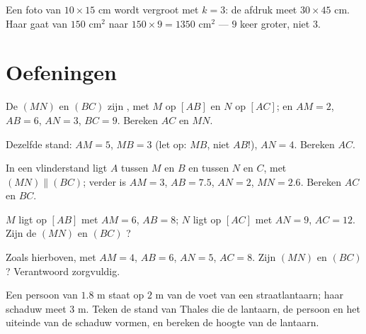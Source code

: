 \begin{example}
Een foto van $10 \times 15$ cm wordt vergroot met  $k = 3$: de afdruk
meet $30 \times 45$ cm. Haar  gaat van $150$ cm$^2$ naar
$150 \times 9 = 1350$ cm$^2$ --- $9$ keer groter, niet $3$.
\end{example}

\section{Oefeningen}

\begin{exercise}[$\star$]\label{exo:g9:thales:1}
De  $(MN)$ en $(BC)$ zijn , met $M$ op $[AB]$ en $N$ op $[AC]$; en
$AM = 2$, $AB = 6$, $AN = 3$, $BC = 9$. Bereken $AC$ en $MN$.
\end{exercise}

\begin{exercise}[$\star$]\label{exo:g9:thales:2}
Dezelfde stand: $AM = 5$, $MB = 3$ (let op: $MB$, niet $AB$!), $AN = 4$. Bereken
$AC$.
\end{exercise}

\begin{exercise}[$\star$]\label{exo:g9:thales:3}
In een vlinderstand ligt $A$ tussen $M$ en $B$ en tussen $N$ en $C$, met
$(MN) \parallel (BC)$; verder is $AM = 3$, $AB = 7.5$, $AN = 2$, $MN = 2.6$.
Bereken $AC$ en $BC$.
\end{exercise}

\begin{exercise}[$\star$]\label{exo:g9:thales:4}
$M$ ligt op $[AB]$ met $AM = 6$, $AB = 8$; $N$ ligt op $[AC]$ met $AN = 9$,
$AC = 12$. Zijn de  $(MN)$ en $(BC)$ ?
\end{exercise}

\begin{exercise}[$\star\star$]\label{exo:g9:thales:5}
Zoals hierboven, met $AM = 4$, $AB = 6$, $AN = 5$, $AC = 8$. Zijn $(MN)$ en
$(BC)$ ? Verantwoord zorgvuldig.
\end{exercise}

\begin{exercise}[$\star\star$]\label{exo:g9:thales:6}
Een persoon van $1.8$ m staat op $2$ m van de voet van een straatlantaarn; haar
schaduw meet $3$ m. Teken de stand van Thales die de lantaarn, de persoon en het
uiteinde van de schaduw vormen, en bereken de hoogte van de lantaarn.
\end{exercise}

